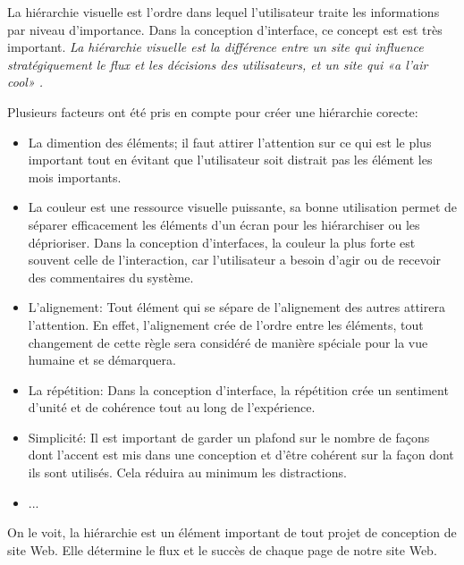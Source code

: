 La hiérarchie visuelle est l'ordre dans lequel l'utilisateur traite les informations par niveau d'importance.
Dans la conception d'interface, ce concept est est très important.
\textit{La hiérarchie visuelle est la différence entre un site qui influence stratégiquement le flux et les 
décisions des utilisateurs, et un site qui «a l'air cool» \cite{cao20155}.}
\par 
Plusieurs facteurs ont été pris en compte pour créer une hiérarchie corecte:
\begin{itemize}
        \item La dimention des éléments; il faut attirer l'attention sur ce qui est le plus important
        tout en évitant que l'utilisateur soit distrait pas les élément les mois importants.
        \item La couleur est une ressource visuelle puissante, sa bonne utilisation permet de séparer 
        efficacement les éléments d'un écran pour les hiérarchiser ou les déprioriser. Dans la 
        conception d’interfaces, la couleur la plus forte est souvent celle de l’interaction, 
        car l’utilisateur a besoin d’agir ou de recevoir des commentaires du système.
        \item L'alignement: Tout élément qui se sépare de l'alignement des autres attirera l'attention. 
        En effet, l'alignement crée de l'ordre entre les éléments, tout changement de cette règle sera 
        considéré de manière spéciale pour la vue humaine et se démarquera.
        \item La répétition: Dans la conception d'interface, la répétition crée un sentiment 
        d'unité et de cohérence tout au long de l'expérience.
        \item Simplicité: Il est important de garder un plafond sur le nombre de façons dont l'accent est
         mis dans une conception et d'être cohérent sur la façon dont ils sont utilisés. 
         Cela réduira au minimum les distractions.
        \item ...\cite{design}

\end{itemize}
On le voit, la hiérarchie est un élément important de tout projet de conception de site Web. 
Elle détermine le flux et le succès de chaque page de notre site Web.


